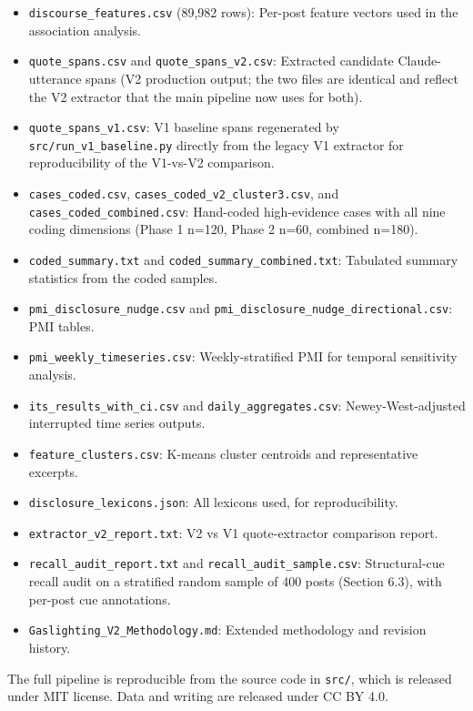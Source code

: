 \documentclass[11pt]{article}
\begin{document}
\begin{itemize}[leftmargin=*]
  \item \texttt{discourse\_features.csv} (89,982 rows): Per-post feature vectors used in the association analysis.
  \item \texttt{quote\_spans.csv} and \texttt{quote\_spans\_v2.csv}: Extracted candidate Claude-utterance spans (V2 production output; the two files are identical and reflect the V2 extractor that the main pipeline now uses for both).
  \item \texttt{quote\_spans\_v1.csv}: V1 baseline spans regenerated by \texttt{src/run\_v1\_baseline.py} directly from the legacy V1 extractor for reproducibility of the V1-vs-V2 comparison.
  \item \texttt{cases\_coded.csv}, \texttt{cases\_coded\_v2\_cluster3.csv}, and \texttt{cases\_coded\_combined.csv}: Hand-coded high-evidence cases with all nine coding dimensions (Phase 1 n=120, Phase 2 n=60, combined n=180).
  \item \texttt{coded\_summary.txt} and \texttt{coded\_summary\_combined.txt}: Tabulated summary statistics from the coded samples.
  \item \texttt{pmi\_disclosure\_nudge.csv} and \texttt{pmi\_disclosure\_nudge\_directional.csv}: PMI tables.
  \item \texttt{pmi\_weekly\_timeseries.csv}: Weekly-stratified PMI for temporal sensitivity analysis.
  \item \texttt{its\_results\_with\_ci.csv} and \texttt{daily\_aggregates.csv}: Newey-West-adjusted interrupted time series outputs.
  \item \texttt{feature\_clusters.csv}: K-means cluster centroids and representative excerpts.
  \item \texttt{disclosure\_lexicons.json}: All lexicons used, for reproducibility.
  \item \texttt{extractor\_v2\_report.txt}: V2 vs V1 quote-extractor comparison report.
  \item \texttt{recall\_audit\_report.txt} and \texttt{recall\_audit\_sample.csv}: Structural-cue recall audit on a stratified random sample of 400 posts (Section 6.3), with per-post cue annotations.
  \item \texttt{Gaslighting\_V2\_Methodology.md}: Extended methodology and revision history.
\end{itemize}

The full pipeline is reproducible from the source code in \texttt{src/}, which is released under MIT license. Data and writing are released under CC BY 4.0.
\end{document}
